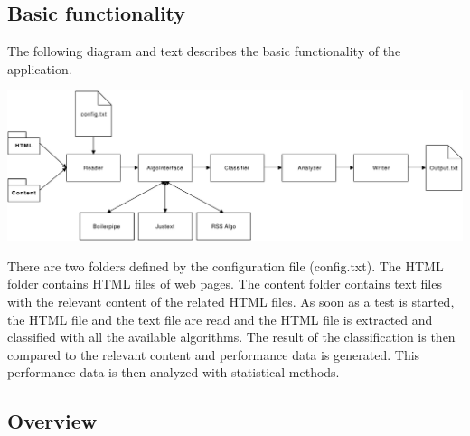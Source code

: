 \begin{landscape}

\subsection{Basic functionality}
The following diagram and text describes the basic functionality of the application.

\includegraphics[width=24cm]{Figures/AppOverview.pdf}

There are two folders defined by the configuration file (config.txt). The HTML folder contains  HTML files of web pages. The content folder contains text files with the relevant content of the related HTML files. As soon as a test is started, the HTML file and the text file are read and the HTML file is extracted and classified with all the available algorithms. The result of the classification is then compared to the relevant content and performance data is generated. This performance data is then analyzed with statistical methods. 

\end{landscape}



\subsection{Overview}

